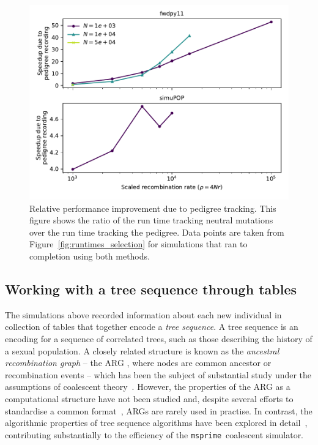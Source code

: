 \documentclass{article}
\newcommand{\simupop}{\texttt{simuPOP}}
\newcommand{\msprime}{\texttt{msprime}}
\begin{document}
\begin{figure}
    \includegraphics[]{sims/speedup}
    \caption{\label{fig:relative_speedup_selection}Relative performance improvement due to pedigree tracking. This figure
    shows the ratio of the run time tracking neutral mutations over the run time tracking the pedigree. Data points are taken
from Figure~\ref{fig:runtimes_selection} for simulations that ran to completion using both methods.}
\end{figure}

%



\subsection*{Working with a tree sequence through tables}

The simulations above recorded information about each new individual
in collection of tables that together encode a \emph{tree sequence}.
A {tree sequence} is an encoding for a sequence of correlated trees,
such as those describing the history of a sexual population.
A closely related structure is known as the \emph{ancestral recombination graph} --
the {ARG} \citep{griffiths1991two,griffiths1997ancestral},
where nodes are common ancestor or recombination events --
which has been the subject of substantial study
under the assumptions of coalescent
theory~\citep{wiuf1997number,wiuf1999ancestry,marjoram2006coalescent,wilton2015smc}.
However, the properties of the ARG as a computational structure have not
been studied and, despite several efforts to standardise a common
format~\citep{morin2006netgen,mcgill2013graphml}, %
ARGs are rarely used
in practise. In contrast, the algorithmic properties of tree sequence
algorithms have been explored in detail~\citep{kelleher2016efficient},
contributing substantially to the efficiency of the \msprime\ coalescent simulator.
\end{document}
